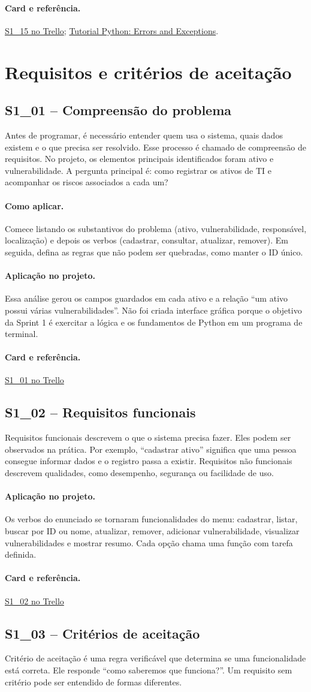 \documentclass[11pt,a4paper]{article}
\newcommand{\projeto}{\paragraph{Aplicação no projeto.}}
\newcommand{\comoaplicar}{\paragraph{Como aplicar.}}
\newcommand{\referencia}[2]{\paragraph{Card e referência.}\href{#1}{#2}}
\newcommand{\cardsection}[1]{\Needspace{12\baselineskip}\subsection{#1}}
\begin{document}
\referencia{https://trello.com/c/qSZwgosj}{S1\_15 no Trello}; \href{https://docs.python.org/3/tutorial/errors.html}{Tutorial Python: Errors and Exceptions}.

\section{Requisitos e critérios de aceitação}

\cardsection{S1\_01 -- Compreensão do problema}

Antes de programar, é necessário entender quem usa o sistema, quais dados existem e o que precisa ser resolvido. Esse processo é chamado de compreensão de requisitos. No projeto, os elementos principais identificados foram ativo e vulnerabilidade. A pergunta principal é: como registrar os ativos de TI e acompanhar os riscos associados a cada um?

\comoaplicar
Comece listando os substantivos do problema (ativo, vulnerabilidade, responsável, localização) e depois os verbos (cadastrar, consultar, atualizar, remover). Em seguida, defina as regras que não podem ser quebradas, como manter o ID único.

\projeto
Essa análise gerou os campos guardados em cada ativo e a relação ``um ativo possui várias vulnerabilidades''. Não foi criada interface gráfica porque o objetivo da Sprint 1 é exercitar a lógica e os fundamentos de Python em um programa de terminal.

\referencia{https://trello.com/c/2nV6OG9q}{S1\_01 no Trello}

\cardsection{S1\_02 -- Requisitos funcionais}

Requisitos funcionais descrevem o que o sistema precisa fazer. Eles podem ser observados na prática. Por exemplo, ``cadastrar ativo'' significa que uma pessoa consegue informar dados e o registro passa a existir. Requisitos não funcionais descrevem qualidades, como desempenho, segurança ou facilidade de uso.

\projeto
Os verbos do enunciado se tornaram funcionalidades do menu: cadastrar, listar, buscar por ID ou nome, atualizar, remover, adicionar vulnerabilidade, visualizar vulnerabilidades e mostrar resumo. Cada opção chama uma função com tarefa definida.

\referencia{https://trello.com/c/nPnrvQad}{S1\_02 no Trello}

\cardsection{S1\_03 -- Critérios de aceitação}

Critério de aceitação é uma regra verificável que determina se uma funcionalidade está correta. Ele responde ``como saberemos que funciona?''. Um requisito sem critério pode ser entendido de formas diferentes.
\end{document}
